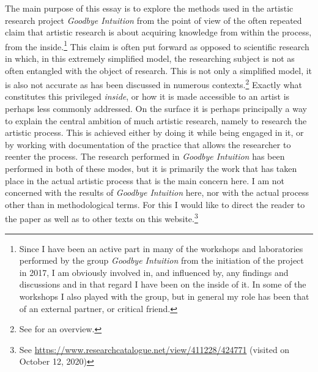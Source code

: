 \documentclass[11pt]{article}
\begin{document}
The main purpose of this essay is to explore the methods used in the artistic research project \emph{Goodbye Intuition} from the point of view of the often repeated claim that artistic research is about acquiring knowledge from within the process, from the inside.\footnote{Since I have been an active part in many of the workshops and laboratories performed by the group \emph{Goodbye Intuition} from the initiation of the project in 2017, I am obviously involved in, and influenced by, any findings and discussions and in that regard I have been on the inside of it. In some of the workshops I also played with the group, but in general my role has been that of an external partner, or critical friend.} This claim is often put forward as opposed to scientific research in which, in this extremely simplified model, the researching subject is not as often entangled with the object of research. This is not only a simplified model, it is also not accurate as has been discussed in numerous contexts.\footnote{See \citet{frisk-ost13} for an overview.} Exactly what constitutes this privileged \emph{inside}, or how it is made accessible to an artist is perhaps less commonly addressed. On the surface it is perhaps principally a way to explain the central ambition of much artistic research, namely to research the artistic process. This is achieved either by doing it while being engaged in it, or by working with documentation of the practice that allows the researcher to reenter the process. The research performed in \emph{Goodbye Intuition} has been performed in both of these modes, but it is primarily the work that has taken place in the actual artistic process that is the main concern here. I am not concerned with the results of \emph{Goodbye Intuition} here, nor with the actual process other than in methodological terms. For this I would like to direct the reader to the paper  \citep{Frisk2020} as well as to other texts on this website.\footnote{See \url{https://www.researchcatalogue.net/view/411228/424771} (visited on October 12, 2020)}
\end{document}
